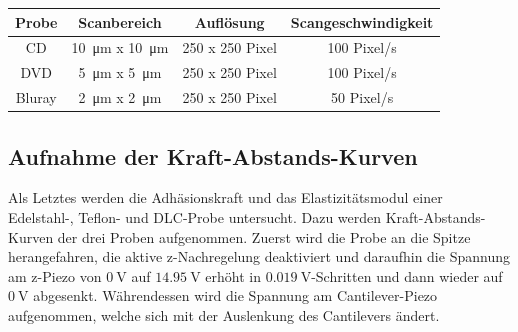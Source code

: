     \begin{center}
      \label{tab:Scanparameter}
      \begin{tabular}{c c c c}
          \toprule
          Probe & Scanbereich & Auflösung & Scangeschwindigkeit \\
          \midrule
          CD      & \SI{10}{\micro\metre} x \SI{10}{\micro\metre} & 250 x 250 Pixel & 100 Pixel/s \\
          DVD     & \SI{5}{\micro\metre} x \SI{5}{\micro\metre}   & 250 x 250 Pixel & 100 Pixel/s \\
          Bluray  & \SI{2}{\micro\metre} x \SI{2}{\micro\metre}   & 250 x 250 Pixel & 50 Pixel/s \\

          \bottomrule
      \end{tabular}
  \end{center}
  \subsection{Aufnahme der Kraft-Abstands-Kurven}
    Als Letztes werden die Adhäsionskraft und das Elastizitätsmodul einer Edelstahl-, Teflon- und DLC-Probe untersucht. Dazu werden Kraft-Abstands-Kurven der drei Proben aufgenommen.
    Zuerst wird die Probe an die Spitze herangefahren, die aktive z-Nachregelung deaktiviert und daraufhin die Spannung am z-Piezo von $\SI{0}{\volt}$ auf $\SI{14.95}{\volt}$ erhöht in $\SI{0.019}{\volt}$-Schritten und dann wieder auf $\SI{0}{\volt}$ abgesenkt. Währendessen wird die Spannung am Cantilever-Piezo aufgenommen, welche sich mit der Auslenkung des Cantilevers ändert.